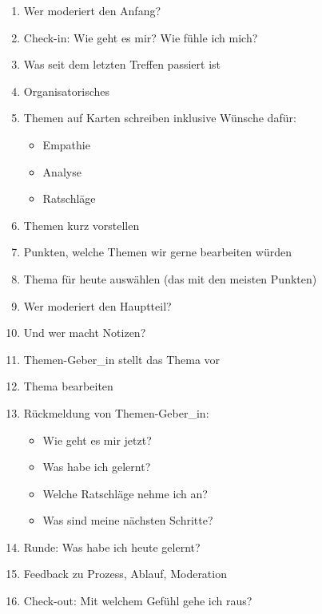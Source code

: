 \begin{enumerate}
    \item Wer moderiert den Anfang?
    \item Check-in: Wie geht es mir? Wie fühle ich mich?
    \item Was seit dem letzten Treffen passiert ist
    \item Organisatorisches
    \item Themen auf Karten schreiben inklusive Wünsche dafür:
    \begin{itemize}
        \item Empathie
        \item Analyse
        \item Ratschläge
    \end{itemize}
    \item Themen kurz vorstellen
    \item Punkten, welche Themen wir gerne bearbeiten würden
    \item Thema für heute auswählen (das mit den meisten Punkten)
    \item Wer moderiert den Hauptteil?
    \item Und wer macht Notizen?
    \item Themen-Geber\_in stellt das Thema vor
    \item Thema bearbeiten
    \item Rückmeldung von Themen-Geber\_in:
    \begin{itemize}
        \item Wie geht es mir jetzt?
        \item Was habe ich gelernt?
        \item Welche Ratschläge nehme ich an?
        \item Was sind meine nächsten Schritte?
    \end{itemize}
    \item Runde: Was habe ich heute gelernt?
    \item Feedback zu Prozess, Ablauf, Moderation
    \item Check-out: Mit welchem Gefühl gehe ich raus?
\end{enumerate}
